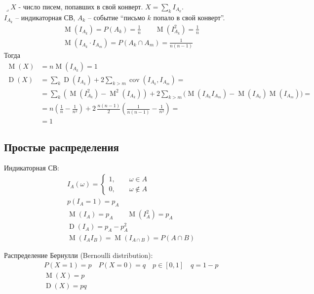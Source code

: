 \documentclass[a4paper,12pt,fleqn]{article}
\newenvironment{onsamepage} {\begin{minipage}{\textwidth}} {\end{minipage}}
\numberwithin{figure}{section}
\theoremstyle{definition}
\DeclareMathOperator{\cov}{cov}
\DeclareMathOperator{\M}{M}
\DeclareMathOperator{\D}{D}
\def\lets{{\huge$\lrcorner$}\space}
\begin{document}
\begin{onsamepage}
\lets $X$ - число писем, попавших в свой конверт. $X = \sum_k I_{A_k}$. \\
$I_{A_k}$ -- индикаторная СВ,
$A_k$ -- событие ``письмо $k$ попало в свой конверт''.
\begin{align*}
&	\M(I_{A_k}) = P(A_k) = \frac{1}{n}	\qquad	\M(I_{A_k}^2) = \frac{1}{n} \\
&	\M(I_{A_k} \cdot I_{A_m}) = P(A_k \cap A_m) = \frac{1}{n(n-1)}
\end{align*}
Тогда
\begin{align*}
\M(X) &= n \M(I_{A_k}) = 1		\\
\D(X) &= \sum_k \D(I_{A_k}) + 2 \sum_{k>m} \cov(I_{A_k},I_{A_m}) = \\
	  &=   \sum_k \left( \M(I_{A_k}^2) - \M^2(I_{A_k}) \right)
	 	 +2\sum_{k>m} \big( \M(I_{A_k} I_{A_m}) - \M(I_{A_k}) \M(I_{A_m}) \big) = \\
	  &= n \left( \frac{1}{n} - \frac{1}{n^2} \right)
	     + 2\, \frac{n(n-1)}{2} \left( \frac{1}{n(n-1)} - \frac{1}{n^2} \right) = \\
	  &= 1
\end{align*}
\end{onsamepage}


\subsection{Простые распределения}


Индикаторная СВ:
\begin{align*}
&	I_A(\omega) = \begin{cases*}
			1, \qquad \omega \in A	\\
			0, \qquad \omega \notin A
		\end{cases*}	\\
&	p(I_A=1) = p_A		\\
&	\M(I_A) = p_A	\qquad	\M(I_A^2) = p_A  \\
&	\D(I_A) = p_A - p_A^2	\\
&	\M(I_A I_B) = \M(I_{A \cap B}) = P(A \cap B)
\end{align*}

Распределение Бернулли (Bernoulli distribution):
\begin{align*}
&	P(X=1)=p \quad P(X=0)=q \quad p\in[0,1] \quad q=1-p \\
&	\M(X) = p \\
&	\D(X) = pq
\end{align*}
\end{document}
